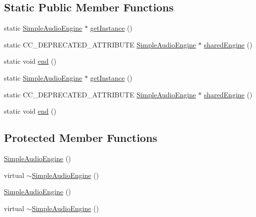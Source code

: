 \subsection*{Static Public Member Functions}
\begin{DoxyCompactItemize}
\item 
static \hyperlink{classCocosDenshion_1_1SimpleAudioEngine}{Simple\+Audio\+Engine} $\ast$ \hyperlink{classCocosDenshion_1_1SimpleAudioEngine_a8e4d576d77c99f5f3f755fa374c36275}{get\+Instance} ()
\item 
static C\+C\+\_\+\+D\+E\+P\+R\+E\+C\+A\+T\+E\+D\+\_\+\+A\+T\+T\+R\+I\+B\+U\+TE \hyperlink{classCocosDenshion_1_1SimpleAudioEngine}{Simple\+Audio\+Engine} $\ast$ \hyperlink{classCocosDenshion_1_1SimpleAudioEngine_a0ba9c4ae57006f7aad560f70d836ed75}{shared\+Engine} ()
\item 
static void \hyperlink{classCocosDenshion_1_1SimpleAudioEngine_a2750af49fe41ee3fcf3d544f05ef3c73}{end} ()
\item 
static \hyperlink{classCocosDenshion_1_1SimpleAudioEngine}{Simple\+Audio\+Engine} $\ast$ \hyperlink{classCocosDenshion_1_1SimpleAudioEngine_a346acd6242af3094d9c3a42781047a46}{get\+Instance} ()
\item 
static C\+C\+\_\+\+D\+E\+P\+R\+E\+C\+A\+T\+E\+D\+\_\+\+A\+T\+T\+R\+I\+B\+U\+TE \hyperlink{classCocosDenshion_1_1SimpleAudioEngine}{Simple\+Audio\+Engine} $\ast$ \hyperlink{classCocosDenshion_1_1SimpleAudioEngine_a0ba9c4ae57006f7aad560f70d836ed75}{shared\+Engine} ()
\item 
static void \hyperlink{classCocosDenshion_1_1SimpleAudioEngine_a8543d23418a8a299754320929a8ec54b}{end} ()
\end{DoxyCompactItemize}
\subsection*{Protected Member Functions}
\begin{DoxyCompactItemize}
\item 
\hyperlink{classCocosDenshion_1_1SimpleAudioEngine_adf7921cc134fee55ccecd475b45414bc}{Simple\+Audio\+Engine} ()
\item 
virtual \hyperlink{classCocosDenshion_1_1SimpleAudioEngine_a3306ede2d562074bd8c9482ec0cd38fb}{$\sim$\+Simple\+Audio\+Engine} ()
\item 
\hyperlink{classCocosDenshion_1_1SimpleAudioEngine_a19d14efd27352a7d07f274904e44236d}{Simple\+Audio\+Engine} ()
\item 
virtual \hyperlink{classCocosDenshion_1_1SimpleAudioEngine_ae3fb12150db01f41c23f69cf054065d8}{$\sim$\+Simple\+Audio\+Engine} ()
\end{DoxyCompactItemize}


